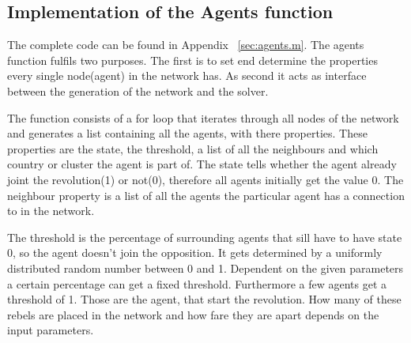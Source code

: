 
\subsection{Implementation of the Agents function}
\label{sec:ImplementAgents }

The complete \matlab code can be found in Appendix ~\ref{sec:agents.m}. The agents function fulfils two purposes. The first is to set end determine the properties every single node(agent) in the network has. As second it acts as interface between the generation of the network and the solver. 

The function consists of a for loop that iterates through all nodes of the network and generates a list containing all the agents, with there properties. These properties are the state, the threshold, a list of all the neighbours and which country or cluster the agent is part of. The state tells whether the agent already joint the revolution(1) or not(0), therefore all agents initially get the value 0. The neighbour property is a list of all the agents the particular agent has a connection to in the network. 

The threshold is the percentage of surrounding agents that sill have to have state 0, so the agent doesn't join the opposition. It gets determined by a  uniformly distributed random number between 0 and 1. Dependent on the given parameters a certain percentage can get a fixed threshold. Furthermore a few agents get a threshold of 1. Those are the agent, that start the revolution. How many of these rebels are placed in the network and how fare they are apart depends on the input parameters. 

